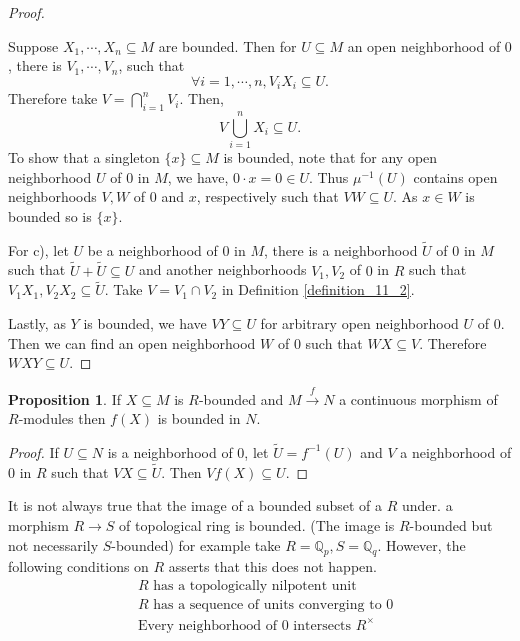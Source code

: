 \documentclass[10pt]{article}
\numberwithin{equation}{section}
\theoremstyle{definition}
\newtheorem{proposition}{Proposition}[subsection]
\newcommand{\Q}[0]{\mathbb{Q}}
\begin{document}
\begin{proof}$\:$
    \par Suppose $X_1,\cdots,X_n\subseteq M$ are bounded. Then for $U\subseteq M$ an open neighborhood of $0$, there is $V_1,\cdots,V_n$, such that
    \begin{equation*}
    \forall i=1,\cdots,n, V_i X_i \subseteq U.
    \end{equation*}
    Therefore take $V=\bigcap_{i=1}^n V_i$. Then,
    \begin{equation*}
    V\bigcup_{i=1}^n X_i \subseteq U.
    \end{equation*}
    To show that a singleton $\{x\}\subseteq M$ is bounded, note that for any open neighborhood $U$ of $0$ in $M$, we have, $0\cdot x =0\in U$. Thus $\mu^{-1}(U)$ contains open neighborhoods $V,W$ of $0$ and $x$, respectively such that $VW\subseteq U$. As $x\in W$ is bounded so is $\{x\}$.
    \par For c), let $U$ be a neighborhood of $0$ in $M$, there is a neighborhood $\tilde{U}$ of $0$ in $M$ such that $\tilde{U}+\tilde{U}\subseteq U$ and another neighborhoods $V_1,V_2$ of $0$ in $R$ such that $V_1X_1,V_2X_2\subseteq \tilde{U}$. Take $V = V_1\cap V_2$ in Definition \ref{definition_11_2}.
    \par Lastly, as $Y$ is bounded, we have $VY\subseteq U$ for arbitrary open neighborhood $U$ of $0$. Then we can find an open neighborhood $W$ of $0$ such that $WX\subseteq V$. Therefore $WXY\subseteq U$.
\end{proof}
\begin{proposition}
    \label{fact_3_another}
    If $X\subseteq M$ is $R$-bounded and $M\stackrel{f}{\to}N$ a continuous morphism of $R$-modules then $f(X)$ is bounded in $N$.
\end{proposition}
\begin{proof}
    If $U\subseteq N$ is a neighborhood of $0$, let $\tilde{U} = f^{-1}(U)$ and $V$ a neighborhood of $0$ in $R$ such that $VX\subseteq\tilde{U}$. Then $Vf(X)\subseteq U$.
\end{proof}
It is not always true that the image of a bounded subset of a $R$ under. a morphism $R\to S$ of topological ring is bounded. (The image is $R$-bounded but not necessarily $S$-bounded) for example take $R=\Q_p,S=\Q_q$. However, the following conditions on $R$ asserts that this does not happen.
\begin{align*}
    &\text{$R$ has a topologically nilpotent unit}\tag{T}\label{T}\\
    &\text{$R$ has a sequence of units converging to $0$}\tag{H}\label{H}\\
    &\text{Every neighborhood of $0$ intersects $R^\times$}\tag{E}\label{E}
\end{align*}
\end{document}

